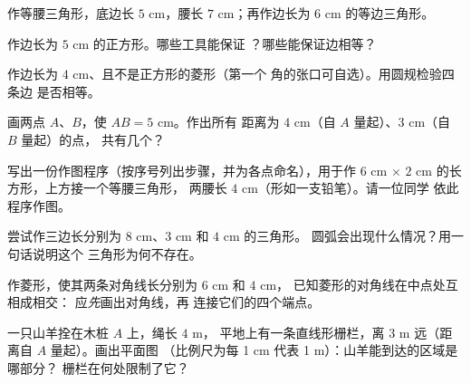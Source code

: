 \begin{exercise}[$\star$]\label{exo:g5:geometry:4}
作等腰三角形，底边长 $5$ cm，腰长
$7$ cm；再作边长为 $6$ cm 的等边三角形。
\end{exercise}

\begin{exercise}[$\star$]\label{exo:g5:geometry:5}
作边长为 $5$ cm 的正方形。哪些工具能保证
？哪些能保证边相等？
\end{exercise}

\begin{exercise}[$\star$]\label{exo:g5:geometry:6}
作边长为 $4$ cm、且不是正方形的菱形（第一个
角的张口可自选）。用圆规检验四条边
是否相等。
\end{exercise}

\begin{exercise}[$\star$]\label{exo:g5:geometry:7}
画两点 $A$、$B$，使 $AB = 5$ cm。作出所有
距离为 $4$ cm（自 $A$ 量起）、$3$ cm（自 $B$ 量起）的点，
共有几个？
\end{exercise}

\begin{exercise}[$\star$]\label{exo:g5:geometry:8}
写出一份作图程序（按序号列出步骤，并为各点命名），用于作
$6$ cm $\times$ $2$ cm 的长方形，上方接一个等腰三角形，
两腰长 $4$ cm（形如一支铅笔）。请一位同学
依此程序作图。
\end{exercise}

\begin{exercise}[$\star\star$]\label{exo:g5:geometry:9}
尝试作三边长分别为 $8$ cm、$3$ cm 和 $4$ cm 的三角形。
圆弧会出现什么情况？用一句话说明这个
三角形为何不存在。
\end{exercise}

\begin{exercise}[$\star\star$]\label{exo:g5:geometry:10}
作菱形，使其两条对角线长分别为 $6$ cm 和 $4$ cm，
已知菱形的对角线在中点处互相成相交：
应\emph{先}画出对角线，再
连接它们的四个端点。
\end{exercise}

\begin{exercise}[$\star\star$]\label{exo:g5:geometry:11}
一只山羊拴在木桩 $A$ 上，绳长 $4$ m，
平地上有一条直线形栅栏，离 $3$ m 远（距离自 $A$ 量起）。画出平面图
（比例尺为每 1 cm 代表 1 m）：山羊能到达的区域是哪部分？
栅栏在何处限制了它？
\end{exercise}
